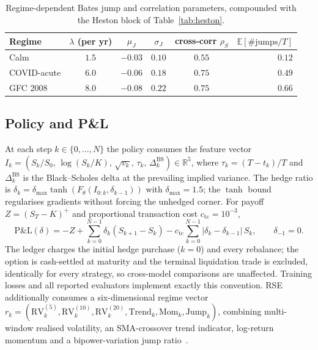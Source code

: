 \documentclass[10pt,letterpaper]{article}
\newcommand{\E}{\mathbb{E}}
\newcommand{\R}{\mathbb{R}}
\begin{document}
\begin{table}[ht]
\centering\small
\caption{Regime-dependent Bates jump and correlation parameters,
compounded with the Heston block of Table~\ref{tab:heston}.}
\label{tab:bates}
\begin{tabular}{@{}lccccr@{}}
\toprule
\textbf{Regime} & $\lambda$ (per yr) & $\mu_J$ & $\sigma_J$ & cross-corr $\rho_S$ & $\E[\#\text{jumps}/T]$ \\\midrule
Calm                & $1.5$ & $-0.03$ & $0.10$ & $0.55$ & $0.12$ \\
COVID-acute         & $6.0$ & $-0.06$ & $0.18$ & $0.75$ & $0.49$ \\
GFC 2008            & $8.0$ & $-0.08$ & $0.22$ & $0.75$ & $0.66$ \\
\bottomrule
\end{tabular}
\end{table}

\subsection{Policy and P\&L}

At each step $k\in\{0,\dots,N\}$ the policy consumes the feature vector
$I_k=(S_k/S_0,\,\log(S_k/K),\,\sqrt{v_k},\,\tau_k,\,\Delta_k^{\mathrm{BS}})\in\R^5$,
where $\tau_k=(T-t_k)/T$ and $\Delta_k^{\mathrm{BS}}$ is the
Black--Scholes delta at the prevailing implied variance. The hedge
ratio is
$\delta_k=\delta_{\max}\tanh(F_\theta(I_{0:k},\delta_{k-1}))$ with
$\delta_{\max}=1.5$; the $\tanh$ bound regularises gradients without
forcing the unhedged corner. For payoff $Z=(S_T-K)^+$ and
proportional transaction cost $c_{\mathrm{tc}}=10^{-3}$,
\begin{equation}
\mathrm{P\&L}(\delta) = -Z + \sum_{k=0}^{N-1}\delta_k(S_{k+1}-S_k)
- c_{\mathrm{tc}}\sum_{k=0}^{N-1}|\delta_k - \delta_{k-1}|\,S_k,
\qquad \delta_{-1}=0.
\label{eq:pnl}
\end{equation}
The ledger charges the initial hedge purchase ($k=0$) and every
rebalance; the option is cash-settled at maturity and the terminal
liquidation trade is excluded, identically for every strategy, so
cross-model comparisons are unaffected. Training losses and all
reported evaluators implement exactly this convention.
RSE additionally consumes a six-dimensional regime vector
$r_k=(\mathrm{RV}_k^{(5)},\mathrm{RV}_k^{(10)},\mathrm{RV}_k^{(20)},
\mathrm{Trend}_k,\mathrm{Mom}_k,\mathrm{Jump}_k)$, combining
multi-window realised volatility, an SMA-crossover trend indicator,
log-return momentum and a bipower-variation jump
ratio~\citep{barndorffnielsen2002econometric}.
\end{document}
